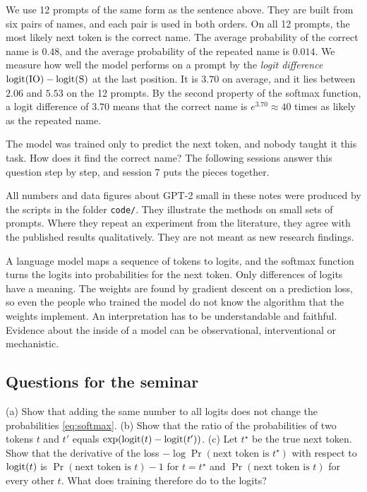 \begin{experiment}\label{exp:ioi} 
We use 12 prompts of the same form as the sentence above. They are built from six pairs of names, and each pair
is used in both orders. On all 12 prompts, the most likely next token is the correct name. The average probability
of the correct name is $0.48$, and the average probability of the repeated name is $0.014$. We measure how well the
model performs on a prompt by the \emph{logit difference} $\mathrm{logit}(\mathrm{IO})-\mathrm{logit}(\mathrm{S})$ at the last
position. It is $3.70$ on average, and it lies between $2.06$ and $5.53$ on the 12 prompts. By the second property
of the softmax function, a logit difference of $3.70$ means that the correct name is $e^{3.70}\approx40$ times as
likely as the repeated name.
\end{experiment}

The model was trained only to predict the next token, and nobody taught it this task. How does it find the
correct name? The following sessions answer this question step by step, and session 7 puts the pieces together.

\begin{caution}
All numbers and data figures about GPT-2 small in these notes were produced by the scripts in the folder
\texttt{code/}. They illustrate the methods on small sets of prompts. Where they repeat an experiment from the
literature, they agree with the published results qualitatively. They are not meant as new research findings.
\end{caution}

\begin{takeaways}
A language model maps a sequence of tokens to logits, and the softmax function turns the logits into
probabilities for the next token. Only differences of logits have a meaning. The weights are found by gradient
descent on a prediction loss, so even the people who trained the model do not know the algorithm that the weights
implement. An interpretation has to be understandable and faithful. Evidence about the inside of a model can be
observational, interventional or mechanistic.
\end{takeaways}

\subsection*{Questions for the seminar}

\begin{exercise}\label{ex:softmax}
(a) Show that adding the same number to all logits does not change the probabilities \eqref{eq:softmax}.
(b) Show that the ratio of the probabilities of two tokens $t$ and $t'$ equals $\exp(\mathrm{logit}(t)-\mathrm{logit}(t'))$.
(c) Let $t^\star$ be the true next token. Show that the derivative of the loss $-\log\Pr(\text{next token is }t^\star)$
with respect to $\mathrm{logit}(t)$ is $\Pr(\text{next token is }t)-1$ for $t=t^\star$ and $\Pr(\text{next token is }t)$
for every other $t$. What does training therefore do to the logits?
\end{exercise}

